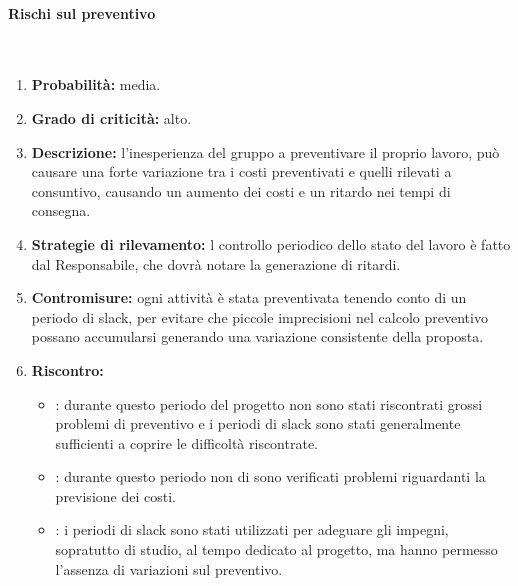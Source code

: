 \paragraph{Rischi sul preventivo}\mbox{}\\
\begin{enumerate}
	\item \textbf{Probabilità:} media.
	\item \textbf{Grado di criticità:} alto.
	\item \textbf{Descrizione:} l’inesperienza del gruppo a preventivare il proprio lavoro, può causare una forte variazione tra i costi preventivati e quelli rilevati a consuntivo, causando un aumento dei costi e un ritardo nei tempi di consegna.
	\item \textbf{Strategie di rilevamento:} l controllo periodico dello stato del lavoro è fatto dal Responsabile, che dovrà notare la generazione di ritardi.
	\item \textbf{Contromisure:} ogni attività è stata preventivata tenendo conto di un periodo di slack, per evitare che piccole imprecisioni nel calcolo preventivo possano accumularsi generando una variazione consistente della proposta.
	\item \textbf{Riscontro:}
	\begin{itemize}
	\item \AR: durante questo periodo del progetto non sono stati riscontrati grossi problemi di preventivo e i periodi di slack sono stati generalmente sufficienti a coprire le difficoltà riscontrate.
	\item \AD: durante questo periodo non di sono verificati problemi riguardanti la previsione dei costi.
	\item \PA: i periodi di slack sono stati utilizzati per adeguare gli impegni, sopratutto di studio, al tempo dedicato al progetto, ma hanno permesso l'assenza di variazioni sul preventivo.
	\end{itemize}
\end{enumerate}